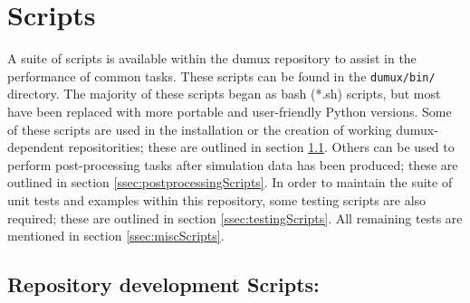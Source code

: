 \section{Scripts}
\label{sc_scripts}

A suite of scripts is available within the dumux repository to assist in the performance of common tasks. These scripts can be found in the \texttt{dumux/bin/} directory. 
The majority of these scripts began as bash (*.sh) scripts, but most have been replaced with more portable and user-friendly Python versions. 
Some of these scripts are used in the installation or the creation of working dumux-dependent repositorities; these are outlined in section \ref{ssec:repoDevScripts}.
Others can be used to perform post-processing tasks after simulation data has been produced; these are outlined in section \ref{ssec:postprocessingScripts}. In order to maintain the suite of unit tests and examples within this repository, some testing scripts are also required; these are outlined in section \ref{ssec:testingScripts}. All remaining tests are mentioned in section \ref{ssec:miscScripts}.

\subsection{Repository development Scripts:} \label{ssec:repoDevScripts}

